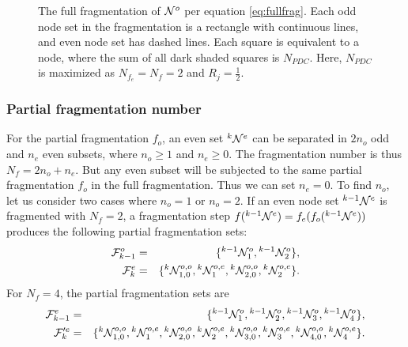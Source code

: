 \begin{figure}
  \caption{The full fragmentation of $\mathcal{N}^o$ per equation \eqref{eq:fullfrag}. Each odd node set in the fragmentation is a rectangle with continuous lines, and even node set has dashed lines. Each square is equivalent to a node, where the sum of all dark shaded squares is $N_{PDC}$. Here, $N_{PDC}$ is maximized as $N_{f_e} = N_{f} = 2$ and $R_j = \frac{1}{2}$. }\label{fig:fragcorrect}
\end{figure}

\subsubsection{Partial fragmentation number}
For the partial fragmentation $f_o$, an even set ${}^{k}\mathcal{N}^e$ can be separated in $2n_o$ odd and $n_e$ even subsets, where $n_o\geq 1$ and $n_e \geq 0$. The fragmentation number is thus $N_f = 2n_o + n_e$. But any even subset will be subjected to the same partial fragmentation $f_o$ in the full fragmentation. Thus we can set $n_e=0$. To find $n_o$, let us consider two cases where $n_o = 1$ or $n_o=2$. If an even node set ${}^{k-1}\mathcal{N}^e$ is fragmented with $N_{f}=2$, a fragmentation step $f({}^{k-1}\mathcal{N}^e)=f_e(f_o({}^{k-1}\mathcal{N}^e))$ produces the following partial fragmentation sets:
\begin{eqnarray*}
  \mathcal{F}^o_{k-1} &=& \{ {}^{k-1} \mathcal{N}^{o}_1, {}^{k-1} \mathcal{N}^{o}_2\},  \\
  \mathcal{F}^e_{k} &=& \{{}^{k}\mathcal{N}^{o,o}_{1,0}, {}^{k}\mathcal{N}^{o,e}_1, {}^{k}\mathcal{N}^{o,o}_{2,0}, {}^{k}\mathcal{N}^{o,e}_2 \}.
\end{eqnarray*}
For $N_{f} = 4$, the partial fragmentation sets are
\begin{eqnarray*}
  \mathcal{F}^e_{k-1} &=& \{ {}^{k-1}\mathcal{N}^{o}_1, {}^{k-1}\mathcal{N}^{o}_2,  {}^{k-1}\mathcal{N}^{o}_3, {}^{k-1}\mathcal{N}^{o}_4\},  \\
  \mathcal{F}'^e_{k} &=& \{{}^{k}\mathcal{N}^{o,o}_{1,0}, {}^{k}\mathcal{N}^{o,e}_1,  {}^{k}\mathcal{N}^{o,o}_{2,0}, {}^{k}\mathcal{N}^{o,e}_2,  {}^{k}\mathcal{N}^{o,o}_{3,0}, {}^{k}\mathcal{N}^{o,e}_3, {}^{k}\mathcal{N}^{o,o}_{4,0}, {}^{k}\mathcal{N}^{o,e}_4 \}.
\end{eqnarray*}

